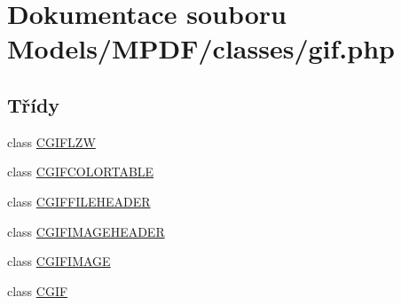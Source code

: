 \hypertarget{gif_8php}{\section{Dokumentace souboru Models/\-M\-P\-D\-F/classes/gif.php}
\label{gif_8php}
}
\subsection*{Třídy}
\begin{DoxyCompactItemize}
\item 
class \hyperlink{class_c_g_i_f_l_z_w}{C\-G\-I\-F\-L\-Z\-W}
\item 
class \hyperlink{class_c_g_i_f_c_o_l_o_r_t_a_b_l_e}{C\-G\-I\-F\-C\-O\-L\-O\-R\-T\-A\-B\-L\-E}
\item 
class \hyperlink{class_c_g_i_f_f_i_l_e_h_e_a_d_e_r}{C\-G\-I\-F\-F\-I\-L\-E\-H\-E\-A\-D\-E\-R}
\item 
class \hyperlink{class_c_g_i_f_i_m_a_g_e_h_e_a_d_e_r}{C\-G\-I\-F\-I\-M\-A\-G\-E\-H\-E\-A\-D\-E\-R}
\item 
class \hyperlink{class_c_g_i_f_i_m_a_g_e}{C\-G\-I\-F\-I\-M\-A\-G\-E}
\item 
class \hyperlink{class_c_g_i_f}{C\-G\-I\-F}
\end{DoxyCompactItemize}

